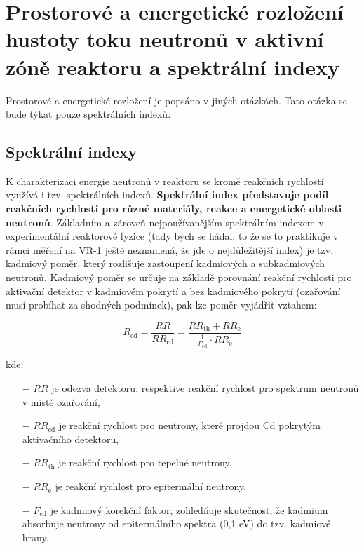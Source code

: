 \section[Prostorové a energetické rozložení hustoty toku, spektrální indexy]{Prostorové a energetické rozložení hustoty toku neutronů v aktivní zóně reaktoru a spektrální indexy}

Prostorové a energetické rozložení je popsáno v jiných otázkách. Tato otázka se bude týkat pouze spektrálních indexů.

\subsection{Spektrální indexy}

K charakterizaci energie neutronů v reaktoru se kromě reakčních rychlostí využívá i tzv. spektrálních indexů. \textbf{Spektrální index představuje podíl reakčních rychlostí pro různé materiály, reakce a energetické oblasti neutronů}. Základním a zároveň nejpoužívanějším spektrálním indexem v experimentální reaktorové fyzice (tady bych se hádal, to že se to praktikuje v rámci měření na VR-1 ještě neznamená, že jde o nejdůležitější index) je tzv. kadmiový poměr, který rozlišuje zastoupení kadmiových a subkadmiových neutronů. Kadmiový poměr se určuje na základě porovnání reakční rychlosti pro aktivační detektor v kadmiovém pokrytí a bez kadmiového pokrytí (ozařování musí probíhat za shodných podmínek), pak lze poměr vyjádřit vztahem:

\begin{equation}
    R_\text{cd} = \frac{RR}{RR_\text{cd}} = \frac{RR_\text{th} + RR_\text{e}}{\frac{1}{F_\text{cd}} \cdot RR_\text{e}}
\end{equation}

kde:

\begin{itemize}%
    \item[$-$] $RR$ je odezva detektoru, respektive reakční rychlost pro spektrum neutronů v místě ozařování,
    \item[$-$] $RR_\text{cd}$ je reakční rychlost pro neutrony, které projdou Cd pokrytým aktivačního detektoru,
    \item[$-$] $RR_\text{th}$ je reakční rychlost pro tepelné neutrony,
    \item[$-$] $RR_\text{e}$ je reakční rychlost pro epitermální neutrony,
    \item[$-$] $F_\text{cd}$ je kadmiový korekční faktor, zohledňuje skutečnost, že kadmium absorbuje neutrony od epitermálního spektra (0,1 eV) do tzv. kadmiové hrany.
\end{itemize}


